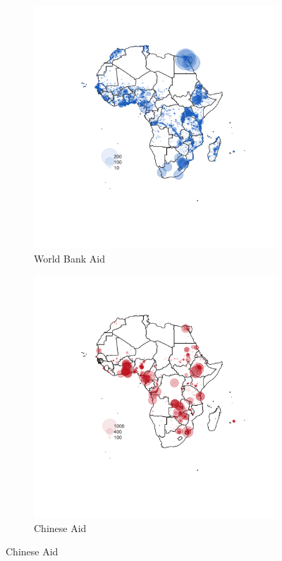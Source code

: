 \documentclass[11pt, oneside]{article}   	%
\begin{document}
\begin{figure}[t]
\centering
\caption{Spatial Distribution of Development Aid Projects to African Nations}

\begin{subfigure}[c]{0.48\textwidth}
\includegraphics[width=\textwidth,trim={15cm 16cm 10cm 8cm},clip]{../../Analysis/output/other_maps/aid_wb.png}
\caption{World Bank Aid}
\label{fig:WB_aid_map}
\end{subfigure}
\begin{subfigure}[c]{0.48\textwidth}
\includegraphics[width=\textwidth,trim={15cm 16cm 10cm 8cm},clip]{../../Analysis/output/other_maps/aid_China.png}
\caption{Chinese Aid}
\label{fig:China_aid_map}
\end{subfigure}


\end{figure}
\end{document}
